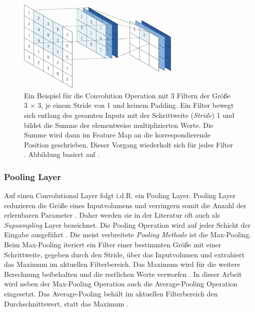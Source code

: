 \begin{figure}
	\centering
	\includegraphics[width=0.7\textwidth]{images/ann_conv/convolution_layer.png}
	\caption{Ein Beispiel für die Convolution Operation mit 3 Filtern der Größe 3 $\times$ 3, je einem Stride von 1 und keinem Padding. Ein Filter bewegt sich entlang des gesamten Inputs mit der Schrittweite (\textit{Stride}) 1 und bildet die Summe der elementweise multiplizierten Werte. Die Summe wird dann im Feature Map an die korrespondierende Position geschrieben. Dieser Vorgang wiederholt sich für jedes Filter \cite{yamashitaConvolutionalNeuralNetworks2018}. Abbildung basiert auf \cite{yamashitaConvolutionalNeuralNetworks2018}.}
	\label{fig:convolution_layer}
\end{figure}

\subsubsection{Pooling Layer}
Auf einen Convolutional Layer folgt i.d.R. ein Pooling Layer. Pooling Layer reduzieren die Größe eines Inputvolumens und verringern somit die Anzahl der erlernbaren Parameter \cite{CS231nConvolutionalNeurala}. Daher werden sie in der Literatur oft auch als \textit{Supsampling} Layer bezeichnet. Die Pooling Operation wird auf jeder Schicht der Eingabe ausgeführt \cite{CS231nConvolutionalNeurala}. Die meist verbreitete \textit{Pooling Methode} ist die Max-Pooling. Beim Max-Pooling iteriert ein Filter einer bestimmten Größe mit einer Schrittweite, gegeben durch den Stride, über das Inputvolumen und extrahiert das Maximum im aktuellen Filterbereich. Das Maximum wird für die weitere Berechnung beibehalten und die restlichen Werte verworfen
 \cite{CS231nConvolutionalNeurala}. In dieser Arbeit wird neben der Max-Pooling Operation auch die Average-Pooling Operation eingesetzt. Das Average-Pooling behält im aktuellen Filterbereich den Durchschnittswert, statt das Maximum \cite{CS231nConvolutionalNeurala}.
 
